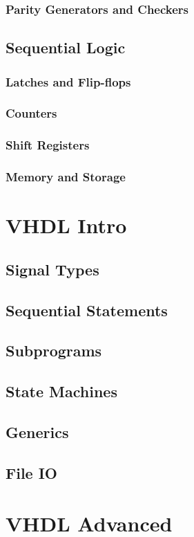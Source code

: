 \subsubsection{Parity Generators and Checkers}

\subsection{Sequential Logic}
\subsubsection{Latches and Flip-flops}
\subsubsection{Counters}
\subsubsection{Shift Registers}
\subsubsection{Memory and Storage}

\section{VHDL Intro}
\subsection{Signal Types}
\subsection{Sequential Statements}
\subsection{Subprograms}
\subsection{State Machines}
\subsection{Generics}
\subsection{File IO}

\section{VHDL Advanced}
